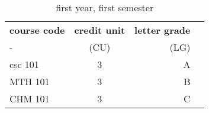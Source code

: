 \documentclass{article}
\begin{document}
	\begin{table}[h!]
		\begin{center}
			\caption{first year, first semester}
			\label{tab:table1}
			\begin{tabular}{|l|c|r|c|}
				\hline
				\textbf{course code} & \textbf{credit unit} & \textbf{letter grade}\\
				- & (CU) & (LG) \\
				\hline
				csc 101 & 3 & A\\
				MTH 101 & 3 & B\\
				CHM 101 & 3 & C\\
				\hline
			\end{tabular}
		\end{center}
	\end{table}
\end{document}
